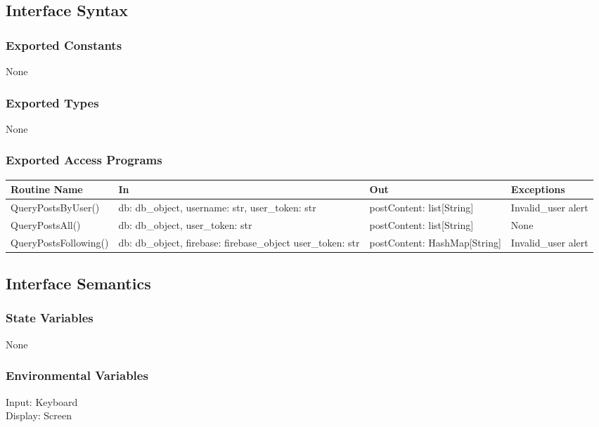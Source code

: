 \documentclass[12pt, titlepage]{article}
\begin{document}
\subsection* {Interface Syntax}
\subsubsection* {Exported Constants}
None

\subsubsection* {Exported Types}
None

\subsubsection* {Exported Access Programs}
\begin{table}[!htb]
    \centering
    \begin{tabular}{|p{4cm}|p{3cm}|p{3cm}|p{4.5cm}|}
        \hline
        \textbf{Routine Name} & \textbf{In} & \textbf{Out} & \textbf{Exceptions} \\
        \hline
         QueryPostsByUser() & db: db\_object, username: str, user\_token: str  & postContent: list[String] & Invalid\_user alert\\
                 \hline
         QueryPostsAll() & db: db\_object, user\_token: str  & postContent: list[String] & None\\
                 \hline
         QueryPostsFollowing() & db: db\_object, firebase: firebase\_object user\_token: str  & postContent: HashMap[String] & Invalid\_user alert\\
         
        \hline
    \end{tabular}
\end{table}

\subsection{Interface Semantics}
\subsubsection{State Variables}
None

\subsubsection{Environmental Variables}
Input: Keyboard\\
Display: Screen
\end{document}
